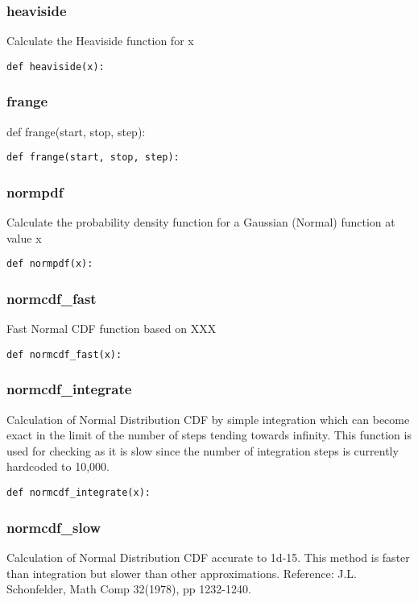 \documentclass[twoside,11pt]{book}
\begin{document}
\subsubsection*{{\bf heaviside}}
Calculate the Heaviside function for x  

\begin{lstlisting}
def heaviside(x):
\end{lstlisting}

\subsubsection*{{\bf frange}}
def frange(start, stop, step): 

\begin{lstlisting}
def frange(start, stop, step):
\end{lstlisting}

\subsubsection*{{\bf normpdf}}
Calculate the probability density function for a Gaussian (Normal) function at value x 

\begin{lstlisting}
def normpdf(x):
\end{lstlisting}

\subsubsection*{{\bf normcdf\_fast}}
Fast Normal CDF function based on XXX  

\begin{lstlisting}
def normcdf_fast(x):
\end{lstlisting}

\subsubsection*{{\bf normcdf\_integrate}}
Calculation of Normal Distribution CDF by simple integration which can become exact in the limit of the number of steps tending towards infinity. This function is used for checking as it is slow since the number of integration steps is currently hardcoded to 10,000. 

\begin{lstlisting}
def normcdf_integrate(x):
\end{lstlisting}

\subsubsection*{{\bf normcdf\_slow}}
Calculation of Normal Distribution CDF accurate to 1d-15. This method is faster than integration but slower than other approximations. Reference: J.L. Schonfelder, Math Comp 32(1978), pp 1232-1240.  
\end{document}
